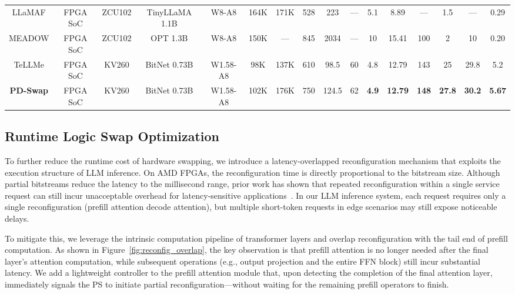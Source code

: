 \documentclass[9pt,sigconf]{acmart}
\begin{document}
\begin{table}[!ht]
{\begin{tabular}{c c c c c c c c c c c c c c c c}
LLaMAF \cite{LLaMAf} & FPGA SoC & ZCU102 & TinyLLaMA 1.1B & W8-A8 & 164K & 171K & 528 & 223 & — & 5.1 & 8.89 & — & 1.5 & — & 0.29 \\
MEADOW \cite{moitra2025meadow} & FPGA SoC & ZCU102 & OPT 1.3B & W8-A8 & 150K & — & 845 & 2034 & — & 10 & 15.41 & 100 & 2 & 10 & 0.20 \\
TeLLMe \cite{qiao2025tellmev2} & FPGA SoC & KV260 & BitNet 0.73B & W1.58-A8 & 98K & 137K & 610 & 98.5 & 60 & 4.8 & 12.79 & 143 & 25 & 29.8 & 5.2 \\
\midrule
\textbf{PD-Swap} & FPGA SoC & KV260 & BitNet 0.73B & W1.58-A8 & 102K & 176K & 750 & 124.5 & 62 & \textbf{4.9} & \textbf{12.79} & \textbf{148} & \textbf{27.8} & \textbf{30.2} & \textbf{5.67} \\
\bottomrule
\end{tabular}
}
\end{table}





\subsection{Runtime Logic Swap Optimization}
To further reduce the runtime cost of hardware swapping, we introduce a latency-overlapped reconfiguration mechanism that exploits the execution structure of LLM inference. On AMD FPGAs, the reconfiguration time is directly proportional to the bitstream size. Although partial bitstreams reduce the latency to the millisecond range, prior work has shown that repeated reconfiguration within a single service request can still incur unacceptable overhead for latency-sensitive applications~\cite{quant_dpr}. In our LLM inference system, each request requires only a single reconfiguration (prefill attention \textrightarrow  decode attention), but multiple short-token requests in edge scenarios may still expose noticeable delays.

To mitigate this, we leverage the intrinsic computation pipeline of transformer layers and overlap reconfiguration with the tail end of prefill computation. As shown in Figure~\ref{fig:reconfig_overlap}, the key observation is that prefill attention is no longer needed after the final layer’s attention computation, while subsequent operations (e.g., output projection and the entire FFN block) still incur substantial latency. We add a lightweight controller to the prefill attention module that, upon detecting the completion of the final attention layer, immediately signals the PS to initiate partial reconfiguration—without waiting for the remaining prefill operators to finish.
\end{document}
